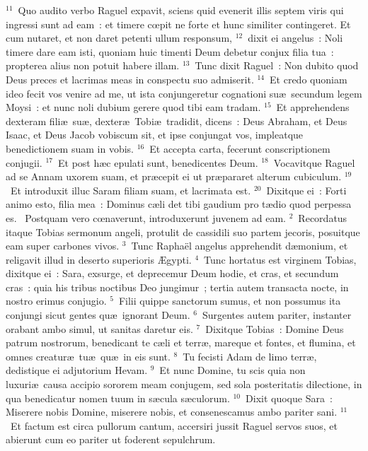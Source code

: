 ${}^{11}$~Quo audito verbo Raguel expavit, sciens quid evenerit illis septem viris qui ingressi sunt ad eam~: et timere cœpit ne forte et hunc similiter contingeret. Et cum nutaret, et non daret petenti ullum responsum,
${}^{12}$~dixit ei angelus~: Noli timere dare eam isti, quoniam huic timenti Deum debetur conjux filia tua~: propterea alius non potuit habere illam.
${}^{13}$~Tunc dixit Raguel~: Non dubito quod Deus preces et lacrimas meas in conspectu suo admiserit.
${}^{14}$~Et credo quoniam ideo fecit vos venire ad me, ut ista conjungeretur cognationi su\ae\ secundum legem Moysi~: et nunc noli dubium gerere quod tibi eam tradam.
${}^{15}$~Et apprehendens dexteram fili\ae\ su\ae , dexter\ae\ Tobi\ae\ tradidit, dicens~: Deus Abraham, et Deus Isaac, et Deus Jacob vobiscum sit, et ipse conjungat vos, impleatque benedictionem suam in vobis.
${}^{16}$~Et accepta carta, fecerunt conscriptionem conjugii.
${}^{17}$~Et post h\ae c epulati sunt, benedicentes Deum.
${}^{18}$~Vocavitque Raguel ad se Annam uxorem suam, et pr\ae cepit ei ut pr\ae pararet alterum cubiculum.
${}^{19}$~Et introduxit illuc Saram filiam suam, et lacrimata est.
${}^{20}$~Dixitque ei~: Forti animo esto, filia mea~: Dominus c\ae li det tibi gaudium pro t\ae dio quod perpessa es.
~Postquam vero cœnaverunt, introduxerunt juvenem ad eam.
${}^{2}$~Recordatus itaque Tobias sermonum angeli, protulit de cassidili suo partem jecoris, posuitque eam super carbones vivos.
${}^{3}$~Tunc Rapha\"el angelus apprehendit d\ae monium, et religavit illud in deserto superioris \AE gypti.
${}^{4}$~Tunc hortatus est virginem Tobias, dixitque ei~: Sara, exsurge, et deprecemur Deum hodie, et cras, et secundum cras~: quia his tribus noctibus Deo jungimur~; tertia autem transacta nocte, in nostro erimus conjugio.
${}^{5}$~Filii quippe sanctorum sumus, et non possumus ita conjungi sicut gentes qu\ae\ ignorant Deum.
${}^{6}$~Surgentes autem pariter, instanter orabant ambo simul, ut sanitas daretur eis.
${}^{7}$~Dixitque Tobias~: Domine Deus patrum nostrorum, benedicant te c\ae li et terr\ae , mareque et fontes, et flumina, et omnes creatur\ae\ tu\ae\ qu\ae\ in eis sunt.
${}^{8}$~Tu fecisti Adam de limo terr\ae , dedistique ei adjutorium Hevam.
${}^{9}$~Et nunc Domine, tu scis quia non luxuri\ae\ causa accipio sororem meam conjugem, sed sola posteritatis dilectione, in qua benedicatur nomen tuum in s\ae cula s\ae culorum.
${}^{10}$~Dixit quoque Sara~: Miserere nobis Domine, miserere nobis, et consenescamus ambo pariter sani.
${}^{11}$~Et factum est circa pullorum cantum, accersiri jussit Raguel servos suos, et abierunt cum eo pariter ut foderent sepulchrum.
